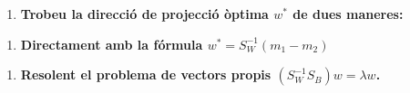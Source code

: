 \documentclass[a4paper]{article}
\begin{document}
\begin{enumerate}[resume=main]
	\item \textbf{Trobeu la direcció de projecció òptima $w^*$ de dues maneres:}
\end{enumerate}

\begin{enumerate}[resume=second,label=(\alph*),itemindent=1em]
	\item \textbf{Directament amb la fórmula $w^* = S_W^{-1} (m_1 - m_2)$}
\end{enumerate}

\begin{enumerate}[resume=second,label=(\alph*),itemindent=1em]
	\item \textbf{Resolent el problema de vectors propis $(S_W^{-1}S_B)w = \lambda w$.}
\end{enumerate}
\end{document}

